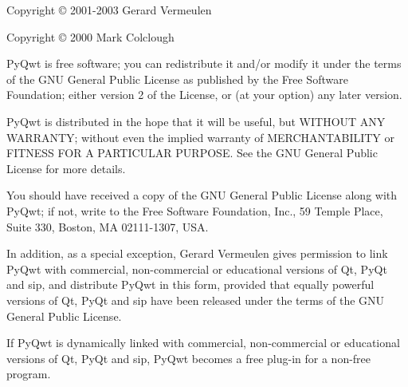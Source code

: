 Copyright \copyright{} 2001-2003 Gerard Vermeulen

Copyright \copyright{} 2000 Mark Colclough

PyQwt is free software; you can redistribute it and/or modify it under the
terms of the GNU General Public License as published by the Free Software
Foundation; either version 2 of the License, or (at your option) any later
version.

PyQwt is distributed in the hope that it will be useful, but WITHOUT ANY
WARRANTY; without even the implied warranty of MERCHANTABILITY or FITNESS
FOR A PARTICULAR PURPOSE.  See the GNU  General Public License for more
details.

You should have received a copy of the GNU General Public License along with
PyQwt; if not, write to the Free Software Foundation, Inc., 59 Temple Place,
Suite 330, Boston, MA 02111-1307, USA.

In addition, as a special exception, Gerard Vermeulen gives permission to
link PyQwt with commercial, non-commercial or educational versions of Qt,
PyQt and sip, and distribute PyQwt in this form, provided that equally
powerful versions of Qt, PyQt and sip have been released under the terms
of the GNU General Public License.

If PyQwt is dynamically linked with commercial, non-commercial or
educational versions of Qt, PyQt and sip, PyQwt becomes a free plug-in
for a non-free program.
